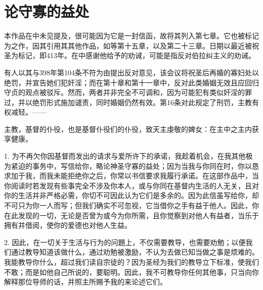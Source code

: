 
\chapter{论守寡的益处}


\par

本作品在中未见提及，很可能因为它是一封信函，故将其列入第七章。它也被标记为之作，因其引用其其他作品，如等第十五章，以及第二十三章。日期以最近被祝圣为标记，即413年。在中感谢他给予的劝诫，可能是指反对伯拉纠主义的劝诫。\par

有人以其与398年第104条不符为由提出反对意见，该会议将祝圣后再婚的寡妇处以绝罚，并宣告她们犯奸淫；而在第十章和第十一章中，反对此类婚姻无效且应回归守贞的观点被驳斥。然而，两者并非完全不可调和，因为可能犯有类似奸淫的罪过，并以绝罚形式施加谴责，同时婚姻仍然有效。第16条对此规定了刑罚，主教有权减轻。——\par

主教，基督的仆役，也是基督仆役们的仆役，致天主虔敬的婢女：在主中之主内获享健康。\par

1. 为不再欠你因基督而发出的请求与爱所许下的承诺，我趁着机会，在我其他极为紧迫的事务中，写信给你，略论神圣守寡的益处；因为当我与你同在时，你以恳求加于我，而我未能拒绝你之后，你常以书信要求我履行承诺。在这部作品中，当你阅读时若发现有些事完全不涉及你本人，或与你同在基督内生活的人无关，且对你的生活并非严格必需，你切不可因此认为它们是多余的。因为此信虽写给你，却不可只为你一人而写；但我们确实不可忽视，它当借你之手有益于他人。因此，你在此发现的一切，无论是否曾为或今为你所需，且你觉察到对他人有益者，当乐于拥有并借阅，使你的爱德也对他人生益。\par

2. 因此，在一切关于生活与行为的问題上，不仅需要教导，也需要劝勉；以便我们通过教导知道该做什么，通过劝勉被激励，不认为去做已知当做之事是烦难的。我能教导你什么，超过我们读自宗徒的？因为圣经为我们的教导立下标准，使我们不敢；而是如他自己所说的，要聪明。因此，我不可教导你任何其他事，只当向你解释那位导师的话，并照主所赐予我的来论述它们。\par

